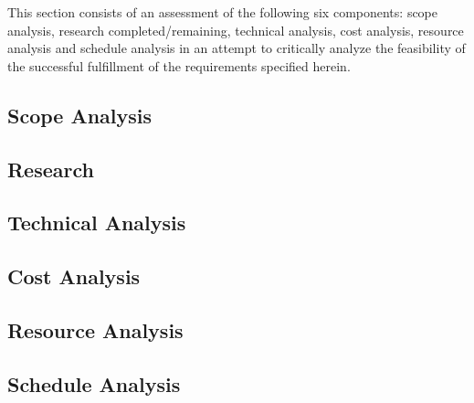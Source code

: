 This section consists of an assessment of the following six components: scope analysis, research completed/remaining, technical analysis, cost analysis, resource analysis and schedule analysis in an attempt to critically analyze the feasibility of the successful fulfillment of the requirements specified herein.
\subsection{Scope Analysis}

\subsection{Research}

\subsection{Technical Analysis}

\subsection{Cost Analysis}

\subsection{Resource Analysis}

\subsection{Schedule Analysis}
